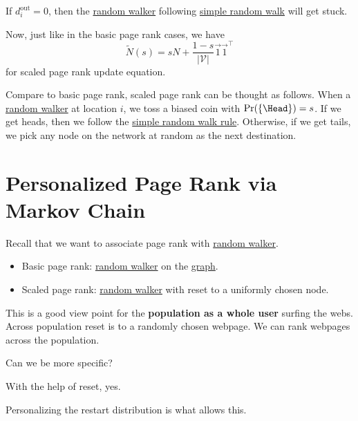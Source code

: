 \begin{note}
	If \(d_i^{\text{out}} = 0\), then the \hyperref[def:random-walker]{random walker} following \hyperref[def:simple-random-walk]{simple random walk} will get stuck.
\end{note}

Now, just like in the basic page rank cases, we have
\[
	\widetilde{N} (s) = s N + \frac{1-s}{\left\vert \mathcal{V}  \right\vert }\vec{1} \vec{1} ^{\top}
\]
for scaled page rank update equation.

\begin{intuition}
	Compare to basic page rank, scaled page rank can be thought as follows. When a \hyperref[def:random-walker]{random walker} at location \(i\), we toss a biased coin with \(\Pr(\{\Head \}) = s\). If we get heads, then we follow the \hyperref[def:simple-random-walk]{simple random walk rule}. Otherwise, if we get tails, we pick any node on the network at random as the next destination.
\end{intuition}

\section{Personalized Page Rank via Markov Chain}
\begin{prev}
	Recall that we want to associate page rank with \hyperref[def:random-walker]{random walker}.
	\begin{itemize}
		\item Basic page rank: \hyperref[def:random-walker]{random walker} on the \hyperref[def:graph]{graph}.
		\item Scaled page rank: \hyperref[def:random-walker]{random walker} with reset to a uniformly chosen node.
	\end{itemize}
\end{prev}
This is a good view point for the \textbf{population as a whole user} surfing the webs. Across population reset is to a randomly chosen webpage. We can rank webpages across the population.

\begin{problem}
Can we be more specific?
\end{problem}
\begin{answer}
	With the help of reset, yes.
	\begin{remark}
		Personalizing the restart distribution is what allows this.
	\end{remark}
\end{answer}

